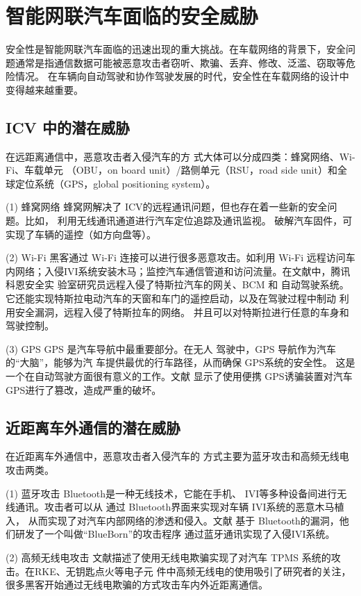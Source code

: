 \section{智能网联汽车面临的安全威胁}
安全性是智能网联汽车面临的迅速出现的重大挑战。在车载网络的背景下，安全问题通常是指通信数据可能被恶意攻击者窃听、欺骗、丢弃、修改、泛滥、窃取等危险情况。
在车辆向自动驾驶和协作驾驶发展的时代，安全性在车载网络的设计中变得越来越重要。

\subsection{ICV 中的潜在威胁}
在远距离通信中，恶意攻击者入侵汽车的方
式大体可以分成四类：蜂窝网络、Wi-Fi、车载单元
（OBU，on board unit）/路侧单元（RSU，road side
unit）和全球定位系统（GPS，global positioning
system）。

(1) 蜂窝网络
蜂窝网解决了 ICV的远程通讯问题，但也存在着一些新的安全问题。比如，
利用无线通讯通道进行汽车定位追踪及通讯监视。
破解汽车固件，可实现了车辆的遥控（如方向盘等）。


(2) Wi-Fi
黑客通过 Wi-Fi 连接可以进行很多恶意攻击。如利用 Wi-Fi 远程访问车内网络；入侵IVI系统安装木马；监控汽车通信管道和访问流量。在文献\cite{keen}中，腾讯科恩安全实
验室研究员远程入侵了特斯拉汽车的网关、BCM 和
自动驾驶系统。它还能实现特斯拉电动汽车的天窗和车门的遥控启动，以及在驾驶过程中制动
利用安全漏洞，远程入侵了特斯拉车的网络。
并且可以对特斯拉进行任意的车身和驾驶控制。

(3) GPS
GPS 是汽车导航中最重要部分。在无人
驾驶中，GPS 导航作为汽车的“大脑”，能够为汽
车提供最优的行车路径，从而确保 GPS系统的安全性。
这是一个在自动驾驶方面很有意义的工作。文献\cite{cuigai}
显示了使用便携 GPS诱骗装置对汽车 GPS进行了篡改，造成严重的破坏。

\subsection{近距离车外通信的潜在威胁}
在近距离车外通信中，恶意攻击者入侵汽车的
方式主要为蓝牙攻击和高频无线电攻击两类。

(1) 蓝牙攻击
Bluetooth是一种无线技术，它能在手机、 IVI等多种设备间进行无线通讯。攻击者可以从
通过 Bluetooth界面来实现对车辆 IVI系统的恶意木马植入，
从而实现了对汽车内部网络的渗透和侵入。文献\cite{antian}
基于 Bluetooth的漏洞，他们研发了一个叫做“BlueBorn”的攻击程序
通过蓝牙通讯实现了入侵IVI系统。

(2) 高频无线电攻击
文献\cite{wuxiandian}描述了使用无线电欺骗实现了对汽车 TPMS 系统的攻击。在RKE、无钥匙点火等电子元
件中高频无线电的使用吸引了研究者的关注，很多黑客开始通过无线电欺骗的方式攻击车内外近距离通信。

